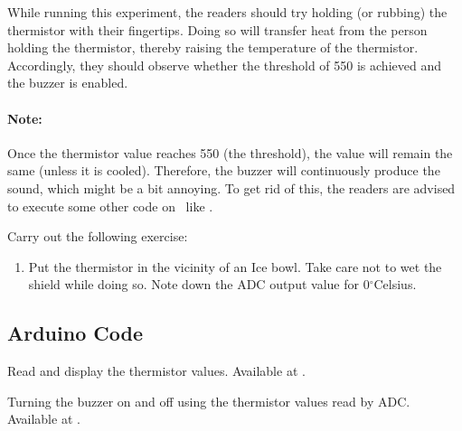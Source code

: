 \begin{enumerate}
        While running this experiment,
        the readers should try holding (or rubbing) the thermistor with their fingertips.
        Doing so will transfer heat from the person holding the
        thermistor, thereby raising the temperature of the thermistor.
        Accordingly, they should observe whether the threshold of 550 is achieved
        and the buzzer is enabled.

        \paragraph{Note:} Once the thermistor value reaches 550 (the threshold), the value will remain the same
        (unless it is cooled). Therefore, the buzzer will continuously produce the sound, which might be
        a bit annoying. To get rid of this, the readers are advised to
        execute some other code on \arduino\ like .

\end{enumerate}

\begin{exercise}
  Carry out the following exercise:
  \begin{enumerate}
    \item Put the thermistor in the vicinity of an Ice bowl. Take care not
          to wet the shield while doing so. Note down the ADC output value for
          0$^{\circ}$Celsius.
  \end{enumerate}
\end{exercise}

\subsection{Arduino Code}
\label{sec:therm-arduino-code}

\begin{ardcode}
   {Read and display
    the thermistor values.  Available at
    .}
  \label{ard:therm-read}
  
\end{ardcode}

\begin{ardcode}
  {Turning the buzzer on and off using the thermistor values read by
    ADC.  Available at
    .}
  \label{ard:therm-buzzer}
  
\end{ardcode}

